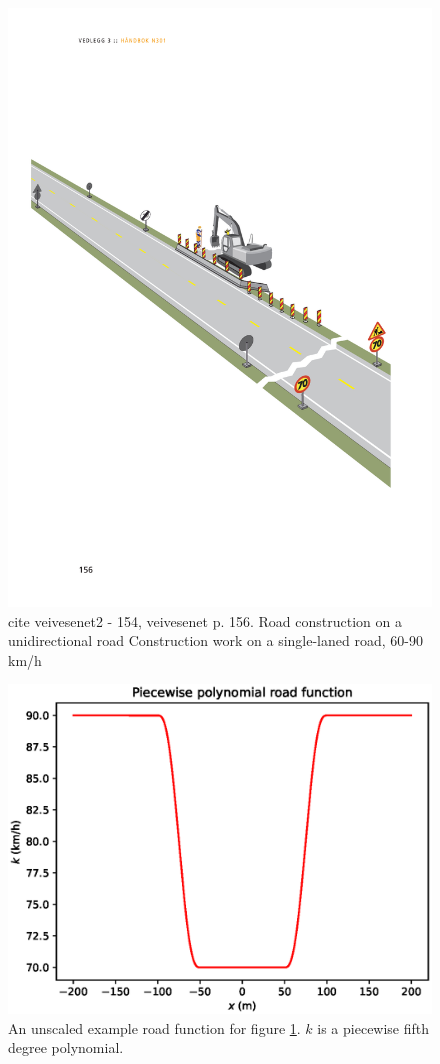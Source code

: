 \begin{figure}
	\centering
	\includegraphics[width=0.7\linewidth]{./figures/veivesenet}
	\caption{cite veivesenet2 - 154, veivesenet p. 156. Road construction on a unidirectional road Construction work on a single-laned road, 60-90 km/h}
	\label{fig:veivesenet}
\end{figure}

\begin{figure}
	\centering
	\includegraphics[width=0.7\linewidth]{./figures/road_func_ex1}
	\caption{An unscaled example road function for figure \ref{fig:veivesenet}. $k$ is a piecewise fifth degree polynomial.}
	\label{fig:road_func_ex}
\end{figure}


